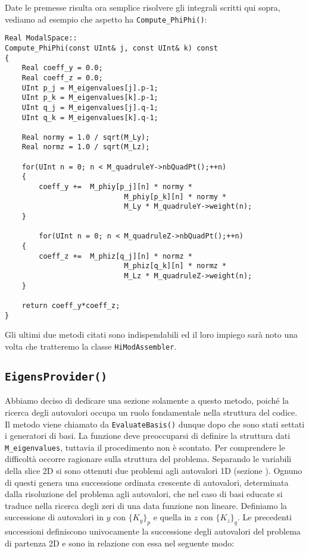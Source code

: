 Date le premesse risulta ora semplice risolvere gli integrali scritti qui sopra, vediamo ad esempio che aspetto ha \texttt{Compute\_PhiPhi()}:


\begin{lstlisting}[style = general]
Real ModalSpace::
Compute_PhiPhi(const UInt& j, const UInt& k) const
{
	Real coeff_y = 0.0;
	Real coeff_z = 0.0;
	UInt p_j = M_eigenvalues[j].p-1;
	UInt p_k = M_eigenvalues[k].p-1;
	UInt q_j = M_eigenvalues[j].q-1;
	UInt q_k = M_eigenvalues[k].q-1;
	
	Real normy = 1.0 / sqrt(M_Ly);
	Real normz = 1.0 / sqrt(M_Lz);
	
	for(UInt n = 0; n < M_quadruleY->nbQuadPt();++n)
	{
		coeff_y +=	M_phiy[p_j][n] * normy *	
							M_phiy[p_k][n] * normy *
							M_Ly * M_quadruleY->weight(n);
	}
	
		for(UInt n = 0; n < M_quadruleZ->nbQuadPt();++n)
	{
		coeff_z +=	M_phiz[q_j][n] * normz *	
							M_phiz[q_k][n] * normz *
							M_Lz * M_quadruleZ->weight(n);
	}
	
	return coeff_y*coeff_z;
}
\end{lstlisting}
 
 Gli ultimi due metodi citati sono indispendabili ed il loro impiego sar\`a noto una volta che tratteremo la classe \texttt{HiModAssembler}.
 
 \subsection{\texttt{EigensProvider()}}
 Abbiamo deciso di dedicare una sezione solamente a questo metodo, poich\'e la ricerca degli autovalori occupa un ruolo fondamentale nella 
struttura del codice.
 Il metodo viene chiamato da \texttt{EvaluateBasis()} dunque dopo che sono stati settati i generatori di basi. La funzione deve preoccuparsi di 
definire la struttura dati \texttt{M\_eigenvalues}, tuttavia il procedimento non \`e scontato. 
 Per comprendere le difficolt\`a occorre ragionare sulla struttura del problema. Separando le variabili della slice 2D si sono ottenuti due 
problemi agli autovalori 1D (sezione ). Ognuno di questi genera una successione ordinata crescente di autovalori, 
determinata dalla risoluzione del problema agli autovalori, che nel caso di basi educate si traduce nella ricerca degli zeri di una data 
funzione non lineare. Definiamo la successione di autovalori in $y$ con $\{K_y\}_p$ e quella in $z$ con $\{K_z\}_q$. Le precedenti successioni 
definiscono univocamente la successione degli autovalori del problema di partenza 2D e sono in relazione con essa nel seguente modo:

